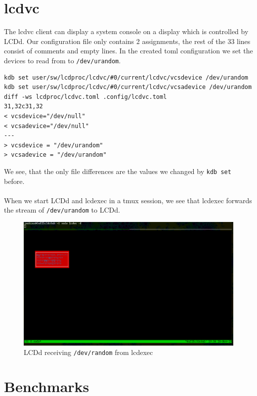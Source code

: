 \documentclass[12pt]{report}
\begin{document}
\section{lcdvc}
The lcdvc client can display a system console on a display which is controlled by LCDd.
Our configuration file only contains 2 assignments, the rest of the 33 lines consist of comments and empty lines.
In the created \acrshort{toml} configuration we set the devices to read from to \texttt{/dev/urandom}.
{\small
\begin{verbatim}
kdb set user/sw/lcdproc/lcdvc/#0/current/lcdvc/vcsdevice /dev/urandom
kdb set user/sw/lcdproc/lcdvc/#0/current/lcdvc/vcsadevice /dev/urandom
diff -ws lcdproc/lcdvc.toml .config/lcdvc.toml
31,32c31,32
< vcsdevice="/dev/null"
< vcsadevice="/dev/null"
---
> vcsdevice = "/dev/urandom"
> vcsadevice = "/dev/urandom"
\end{verbatim}
}
We see, that the only file differences are the values we changed by \texttt{kdb set} before.
\\\\
When we start LCDd and lcdexec in a \acrshort{tmux} session, we see that lcdexec forwards the stream of \texttt{/dev/urandom} to LCDd.
\FloatBarrier
\begin{figure}[h!]
	\centering
		\includegraphics[width=\linewidth]{lcdvc.png}
  \caption{LCDd receiving \texttt{/dev/random} from lcdexec}
\label{fig:lcdvc}
\end{figure}
\FloatBarrier


\section{Benchmarks}
\end{document}
